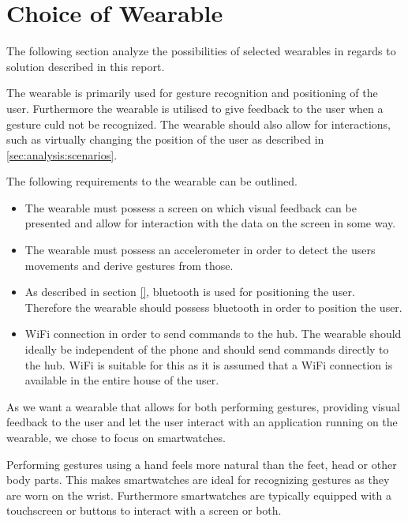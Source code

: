 \section{Choice of Wearable}
\label{sec:analysis:choice-of-wearables}

The following section analyze the possibilities of selected wearables in regards to solution described in this report.

The wearable is primarily used for gesture recognition and positioning of the user. Furthermore the wearable is utilised to give feedback to the user when a gesture culd not be recognized. The wearable should also allow for interactions, such as virtually changing the position of the user as described in \cref{sec:analysis:scenarios}.

The following requirements to the wearable can be outlined.

\begin{itemize}
\item The wearable must possess a screen on which visual feedback can be presented and allow for interaction with the data on the screen in some way.
\item The wearable must possess an accelerometer in order to detect the users movements and derive gestures from those.
\item As described in section \cref{}, bluetooth is used for positioning the user. Therefore the wearable should possess bluetooth in order to position the user. 
\item WiFi connection in order to send commands to the hub. The wearable should ideally be independent of the phone and should send commands directly to the hub. WiFi is suitable for this as it is assumed that a WiFi connection is available in the entire house of the user.
\end{itemize}

As we want a wearable that allows for both performing gestures, providing visual feedback to the user and let the user interact with an application running on the wearable, we chose to focus on smartwatches.

Performing gestures using a hand feels more natural than the feet, head or other body parts. This makes smartwatches are ideal for recognizing gestures as they are worn on the wrist. Furthermore smartwatches are typically equipped with a touchscreen or buttons to interact with a screen or both.

